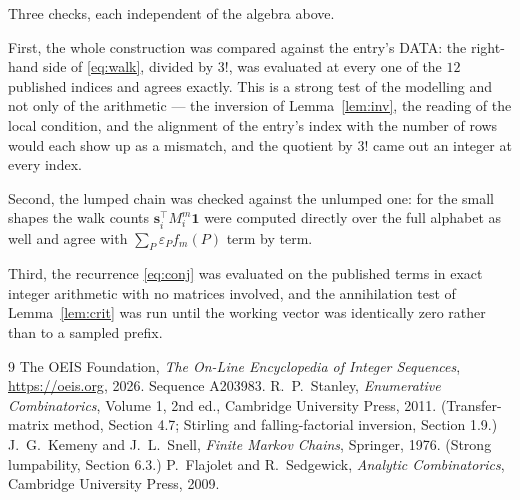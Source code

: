 \documentclass[11pt,a4paper]{article}
\theoremstyle{plain}
\theoremstyle{definition}
\begin{document}
Three checks, each independent of the algebra above.

First, the whole construction was compared against the entry's DATA: the right-hand side of
\eqref{eq:walk}, divided by $3!$, was evaluated at every one of the $12$
published indices and agrees exactly. This is a strong test of the modelling and not only of
the arithmetic --- the inversion of Lemma~\ref{lem:inv}, the reading of the local
condition, and the alignment of the entry's index with the number of rows would each
show up as a mismatch, and the quotient by $3!$ came out an integer at every index.

Second, the lumped chain was checked against the unlumped one: for the small shapes the walk
counts $\mathbf{s}_i^{\!\top}M_i^{m}\mathbf{1}$ were computed directly over the full
alphabet as well and agree with $\sum_P\varepsilon_Pf_m(P)$ term by term.

Third, the recurrence \eqref{eq:conj} was evaluated on the published terms in exact integer
arithmetic with no matrices involved, and the annihilation test of Lemma~\ref{lem:crit} was
run until the working vector was identically zero rather than to a sampled prefix.

\begin{thebibliography}{9}
 The OEIS Foundation, \emph{The On-Line Encyclopedia of Integer
Sequences}, \url{https://oeis.org}, 2026. Sequence A203983.
 R.~P.~Stanley, \emph{Enumerative Combinatorics}, Volume 1, 2nd ed.,
Cambridge University Press, 2011. (Transfer-matrix method, Section 4.7; Stirling and
falling-factorial inversion, Section 1.9.)
 J.~G.~Kemeny and J.~L.~Snell, \emph{Finite Markov Chains}, Springer,
1976. (Strong lumpability, Section 6.3.)
 P.~Flajolet and R.~Sedgewick, \emph{Analytic Combinatorics}, Cambridge
University Press, 2009.
\end{thebibliography}
\end{document}
